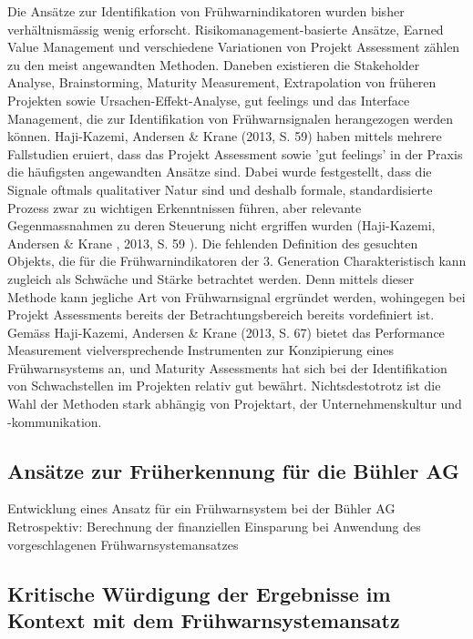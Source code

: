 \newline Die Ansätze zur Identifikation von Frühwarnindikatoren wurden bisher verhältnismässig wenig erforscht. Risikomanagement-basierte Ansätze, Earned Value Management und verschiedene Variationen von Projekt Assessment zählen zu den meist angewandten Methoden. Daneben existieren die Stakeholder Analyse, Brainstorming, Maturity Measurement, Extrapolation von früheren Projekten sowie Ursachen-Effekt-Analyse, gut feelings und das Interface Management, die zur Identifikation von Frühwarnsignalen herangezogen werden können. Haji-Kazemi, Andersen \& Krane (2013, S. 59) haben mittels mehrere Fallstudien eruiert, dass das Projekt Assessment sowie 'gut feelings' in der Praxis die häufigsten angewandten Ansätze sind. Dabei wurde festgestellt, dass die Signale oftmals qualitativer Natur sind und deshalb formale, standardisierte Prozess zwar zu wichtigen Erkenntnissen führen, aber relevante Gegenmassnahmen zu deren Steuerung nicht ergriffen wurden (Haji-Kazemi, Andersen \& Krane , 2013, S. 59 ). Die fehlenden Definition des gesuchten Objekts, die für die Frühwarnindikatoren der 3. Generation Charakteristisch kann zugleich als Schwäche und Stärke betrachtet werden. Denn mittels dieser Methode kann jegliche Art von Frühwarnsignal ergründet werden, wohingegen bei Projekt Assessments bereits der Betrachtungsbereich bereits vordefiniert ist. Gemäss Haji-Kazemi, Andersen \& Krane (2013, S. 67) bietet das Performance Measurement vielversprechende Instrumenten zur Konzipierung eines Frühwarnsystems an, und Maturity Assessments hat sich bei der Identifikation von Schwachstellen im Projekten relativ gut bewährt. Nichtsdestotrotz ist die Wahl der Methoden stark abhängig von Projektart, der Unternehmenskultur und -kommunikation.

\subsection{Ansätze zur Früherkennung für die Bühler AG}
Entwicklung eines Ansatz für ein Frühwarnsystem bei der Bühler AG
Retrospektiv: Berechnung der finanziellen Einsparung bei Anwendung des vorgeschlagenen Frühwarnsystemansatzes
\newpage
\subsection{Kritische Würdigung der Ergebnisse im Kontext mit dem Frühwarnsystemansatz}
\newpage